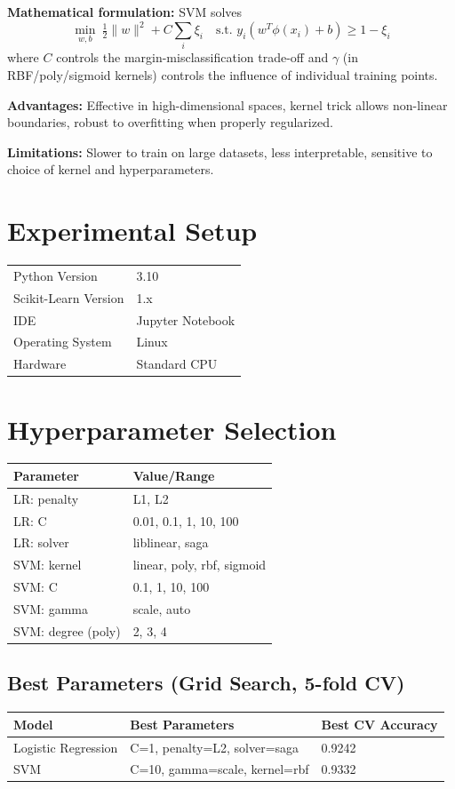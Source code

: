 \documentclass[12pt,a4paper]{article}
\begin{document}
\textbf{Mathematical formulation:} SVM solves
\[
\min_{w,b}\ \tfrac{1}{2}\|w\|^2 + C\sum_i \xi_i \quad \text{s.t. } y_i(w^T\phi(x_i)+b) \ge 1-\xi_i
\]
where $C$ controls the margin-misclassification trade-off and $\gamma$ (in RBF/poly/sigmoid
kernels) controls the influence of individual training points.

\textbf{Advantages:} Effective in high-dimensional spaces, kernel trick allows non-linear
boundaries, robust to overfitting when properly regularized.

\textbf{Limitations:} Slower to train on large datasets, less interpretable, sensitive to
choice of kernel and hyperparameters.

\section{Experimental Setup}
\begin{tabular}{ll}
\toprule
Python Version & 3.10 \\
Scikit-Learn Version & 1.x \\
IDE & Jupyter Notebook \\
Operating System & Linux \\
Hardware & Standard CPU \\
\bottomrule
\end{tabular}

\section{Hyperparameter Selection}

\begin{tabular}{ll}
\toprule
Parameter & Value/Range \\
\midrule
LR: penalty & L1, L2 \\
LR: C & 0.01, 0.1, 1, 10, 100 \\
LR: solver & liblinear, saga \\
SVM: kernel & linear, poly, rbf, sigmoid \\
SVM: C & 0.1, 1, 10, 100 \\
SVM: gamma & scale, auto \\
SVM: degree (poly) & 2, 3, 4 \\
\bottomrule
\end{tabular}

\subsection*{Best Parameters (Grid Search, 5-fold CV)}
\begin{tabular}{lll}
\toprule
Model & Best Parameters & Best CV Accuracy \\
\midrule
Logistic Regression & C=1, penalty=L2, solver=saga & 0.9242 \\
SVM & C=10, gamma=scale, kernel=rbf & 0.9332 \\
\bottomrule
\end{tabular}
\end{document}
